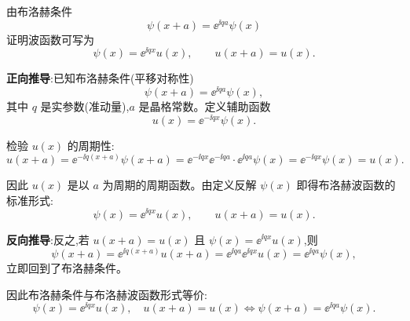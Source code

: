 \begin{question}
由布洛赫条件
\[
\psi(x+a)=\ee^{\ii qa}\psi(x)
\]
证明波函数可写为
\[
\psi(x)=\ee^{\ii qx}u(x),\qquad u(x+a)=u(x).
\]
\end{question}
\begin{solution}
	\textbf{正向推导}:已知布洛赫条件(平移对称性)
	\[
	\psi(x+a)=\ee^{\ii qa}\psi(x),
	\]
	其中 $q$ 是实参数(准动量),$a$ 是晶格常数。定义辅助函数
	\[
	u(x)=\ee^{-\ii qx}\psi(x).
	\]

	检验 $u(x)$ 的周期性:
	\[
	u(x+a)=\ee^{-\ii q(x+a)}\psi(x+a)
	=\ee^{-\ii qx}\ee^{-\ii qa}\cdot \ee^{\ii qa}\psi(x)
	=\ee^{-\ii qx}\psi(x)=u(x).
	\]

	因此 $u(x)$ 是以 $a$ 为周期的周期函数。由定义反解 $\psi(x)$ 即得布洛赫波函数的标准形式:
	\[
	\psi(x)=\ee^{\ii qx}u(x),\qquad u(x+a)=u(x).
	\]

	\textbf{反向推导}:反之,若 $u(x+a)=u(x)$ 且 $\psi(x)=\ee^{\ii qx}u(x)$,则
	\[
	\psi(x+a)=\ee^{\ii q(x+a)}u(x+a)=\ee^{\ii qa}\ee^{\ii qx}u(x)=\ee^{\ii qa}\psi(x),
	\]
	立即回到了布洛赫条件。

	因此布洛赫条件与布洛赫波函数形式等价:
	\[
	\boxed{\psi(x)=\ee^{\ii qx}u(x),\quad u(x+a)=u(x)
	\Longleftrightarrow \psi(x+a)=\ee^{\ii qa}\psi(x)}.
	\]
	\end{solution}

